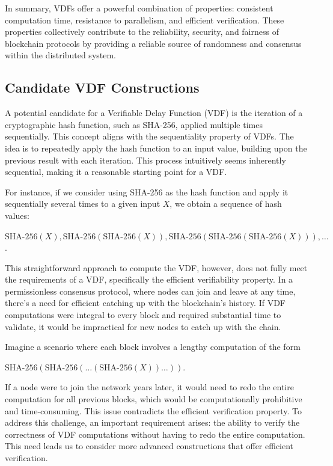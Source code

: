 In summary, VDFs offer a powerful combination of properties: consistent computation time, resistance to parallelism, and efficient verification. These properties collectively contribute to the reliability, security, and fairness of blockchain protocols by providing a reliable source of randomness and consensus within the distributed system.

\subsection{Candidate VDF Constructions}
A potential candidate for a Verifiable Delay Function (VDF) is the iteration of a cryptographic hash function, such as SHA-256, applied multiple times sequentially. This concept aligns with the sequentiality property of VDFs. The idea is to repeatedly apply the hash function to an input value, building upon the previous result with each iteration. This process intuitively seems inherently sequential, making it a reasonable starting point for a VDF.

For instance, if we consider using SHA-256 as the hash function and apply it sequentially several times to a given input \(X\), we obtain a sequence of hash values:

\(\text{SHA-256}(X), \text{SHA-256}(\text{SHA-256}(X)), \text{SHA-256}(\text{SHA-256}(\text{SHA-256}(X))), \ldots\).

This straightforward approach to compute the VDF, however, does not fully meet the requirements of a VDF, specifically the efficient verifiability property. In a permissionless consensus protocol, where nodes can join and leave at any time, there's a need for efficient catching up with the blockchain's history. If VDF computations were integral to every block and required substantial time to validate, it would be impractical for new nodes to catch up with the chain.

Imagine a scenario where each block involves a lengthy computation of the form

\(\text{SHA-256}(\text{SHA-256}(\ldots(\text{SHA-256}(X))\ldots))\).

If a node were to join the network years later, it would need to redo the entire computation for all previous blocks, which would be computationally prohibitive and time-consuming. This issue contradicts the efficient verification property. To address this challenge, an important requirement arises: the ability to verify the correctness of VDF computations without having to redo the entire computation. This need leads us to consider more advanced constructions that offer efficient verification.

